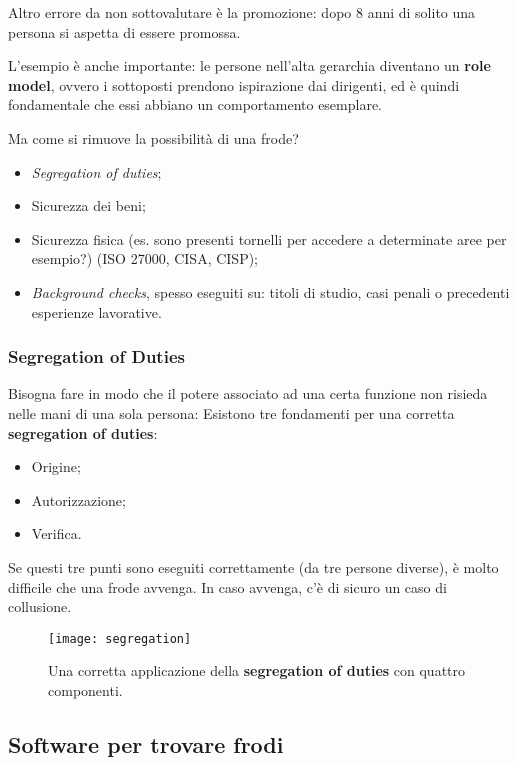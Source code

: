 Altro errore da non sottovalutare è la promozione: dopo 8 anni di solito una
persona si aspetta di essere promossa.

L'esempio è anche importante: le persone nell'alta gerarchia diventano un
\textbf{role model}, ovvero i sottoposti prendono ispirazione dai dirigenti, ed è
quindi fondamentale che essi abbiano un comportamento esemplare.

Ma come si rimuove la possibilità di una frode?
\begin{itemize}
  \item \textit{Segregation of duties};
  \item Sicurezza dei beni;
  \item Sicurezza fisica (es. sono presenti tornelli per accedere a determinate
aree per esempio?) (ISO 27000, CISA, CISP);
  \item \textit{Background checks}, spesso eseguiti su: titoli di studio, 
  casi penali o precedenti esperienze lavorative.
\end{itemize}

\subsubsection{Segregation of Duties}

Bisogna fare in modo che il potere associato ad una certa funzione non risieda
nelle mani di una sola persona:
Esistono tre fondamenti per una corretta \textbf{segregation of duties}:
\begin{itemize}
  \item Origine;
  \item Autorizzazione;
  \item Verifica.
\end{itemize}

Se questi tre punti sono eseguiti correttamente (da tre persone diverse), 
è molto difficile che una frode avvenga. 
In caso avvenga, c'è di sicuro un caso di collusione.

\begin{figure}[H]
 \centering
 \texttt{[image: segregation]}
 \caption{Una corretta applicazione della \textbf{segregation of duties} con 
quattro componenti.}
\end{figure}

\subsection{Software per trovare frodi}

